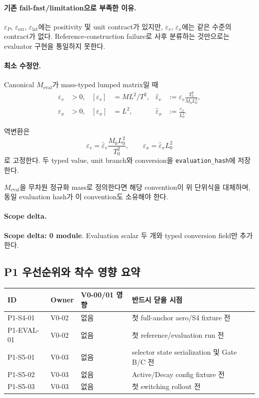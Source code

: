 \documentclass[11pt]{article}
\newcommand{\code}[1]{\texttt{\small #1}}
\newcommand{\scopezero}{\textcolor{SafeGreen}{\textbf{Scope delta: 0 module}}}
\begin{document}
\paragraph{기존 fail-fast/limitation으로 부족한 이유.}
$\varepsilon_P$, $\varepsilon_{\mathrm{err}}$, $\varepsilon_{\mathrm{lat}}$에는 positivity 및 unit contract가 있지만,
$\varepsilon_v$, $\varepsilon_x$에는 같은 수준의 contract가 없다.
Reference-construction failure로 사후 분류하는 것만으로는 evaluator 구현을 통일하지 못한다.

\paragraph{최소 수정안.}
Canonical $M_{\mathrm{eval}}$가 mass-typed lumped matrix일 때
\begin{align}
  \varepsilon_v&>0,
  & [\varepsilon_v]&=ML^2/T^2,
  & \widehat\varepsilon_v
  &:=\varepsilon_v\frac{T_0^2}{M_0L_0^2},\\
  \varepsilon_x&>0,
  & [\varepsilon_x]&=L^2,
  & \widehat\varepsilon_x
  &:=\frac{\varepsilon_x}{L_0^2}.
\end{align}

역변환은
\begin{equation}
  \varepsilon_v
  =
  \widehat\varepsilon_v\frac{M_0L_0^2}{T_0^2},
  \qquad
  \varepsilon_x
  =
  \widehat\varepsilon_xL_0^2
\end{equation}
로 고정한다. 두 typed value, unit branch와 conversion을
\code{evaluation\_hash}에 저장한다.

$M_{\mathrm{eval}}$을 무차원 정규화 mass로 정의한다면 해당 convention이 위 단위식을 대체하며,
동일 evaluation hash가 이 convention도 소유해야 한다.

\paragraph{Scope delta.}
\scopezero. Evaluation scalar 두 개와 typed conversion field만 추가한다.

\subsection{P1 우선순위와 착수 영향 요약}

\begin{tabularx}{\textwidth}{L{0.18\textwidth}L{0.18\textwidth}L{0.24\textwidth}Y}
\toprule
ID & Owner & V0-00/01 영향 & 반드시 닫을 시점 \\
\midrule
P1-S4-01 & V0-02 & 없음 & 첫 full-anchor aero/S4 fixture 전 \\
P1-EVAL-01 & V0-02 & 없음 & 첫 reference/evaluation run 전 \\
P1-S5-01 & V0-03 & 없음 & selector state serialization 및 Gate B/C 전 \\
P1-S5-02 & V0-03 & 없음 & Active/Decay config fixture 전 \\
P1-S5-03 & V0-03 & 없음 & 첫 switching rollout 전 \\
\bottomrule
\end{tabularx}
\end{document}
